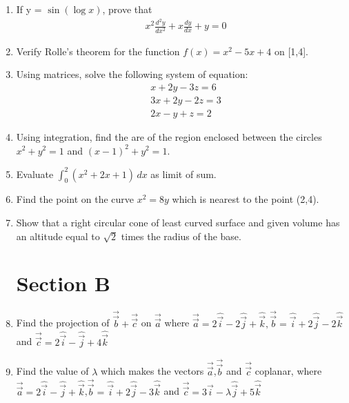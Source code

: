 \documentclass[journal,12pt,twocolumn]{IEEEtran}
\begin{document}
\begin{enumerate}
 \item If y = $\sin(\log x)$, prove that
 \begin{align}
    & x^2\displaystyle\frac{d^2y}{dx^2} + x\displaystyle\frac{dy}{dx} + y = 0 \nonumber
 \end{align}

 \item Verify Rolle's theorem for the function $ f(x) = x^2-5x+4 $ on [1,4].

 \item Using matrices, solve the following system of equation:
 \begin{align}
    & x+2y-3z=6 \nonumber   \\
     & 3x+2y-2z=3 \nonumber   \\
     & 2x-y+z=2 \nonumber 
 \end{align}

 \item Using integration, find the are of the region enclosed between the circles $x^2+y^2=1$ and $(x-1)^2+y^2=1$. 

 \item Evaluate $ \int_{0}^{2} (x^2+2x+1)\, dx $ as limit of sum. 

 \item Find the point on the curve $x^2=8y $ which is nearest to the point (2,4).

 \item Show that a right circular cone of least curved surface and given volume has an altitude equal to $ \sqrt{2} $ times the radius of the base.
 \section{Section B}

 \item Find the projection of $\overrightarrow{\vec{b}}+\overrightarrow{\vec{c}}$ on $\overrightarrow{\vec{a}}$ where $\overrightarrow{\vec{a}}=2\hat{\vec{i}}-2\hat{\vec{j}}+\hat{\vec{k}} , \overrightarrow{\vec{b}}=\hat{\vec{i}}+2\hat{\vec{j}}-2\hat{\vec{k}}$ and $ \overrightarrow{\vec{c}}=2\hat{\vec{i}}-\hat{\vec{j}}+4\hat{\vec{k}}$

 \item Find the value of $\lambda$ which makes the vectors $\overrightarrow{\vec{a}}$,$\overrightarrow{\vec{b}}$ and $\overrightarrow{\vec{c}}$ coplanar, where $ \overrightarrow{\vec{a}}=2\hat{\vec{i}}-\hat{\vec{j}}+\hat{\vec{k}}$,$ \overrightarrow{\vec{b}}=\hat{\vec{i}}+2\hat{\vec{j}}-3\hat{\vec{k}}$ and $ \overrightarrow{\vec{c}}=3\hat{\vec{i}}-\lambda\hat{\vec{j}}+5\hat{\vec{k}}$


\end{enumerate}
\end{document}
